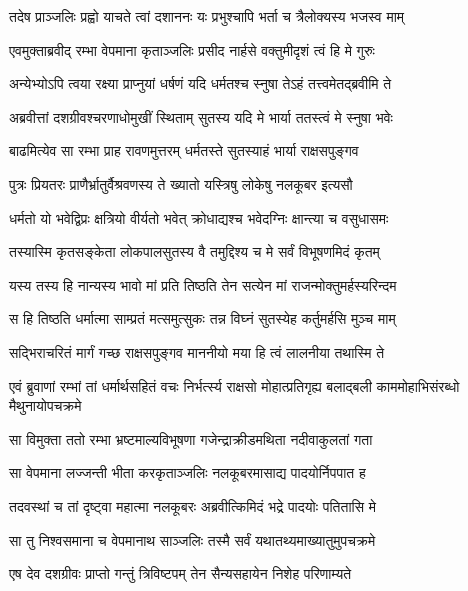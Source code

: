 \twolineshloka
{तदेष प्राञ्जलिः प्रह्वो याचते त्वां दशाननः}
{यः प्रभुश्चापि भर्ता च त्रैलोक्यस्य भजस्व माम्} %

\twolineshloka
{एवमुक्ताब्रवीद् रम्भा वेपमाना कृताञ्जलिः}
{प्रसीद नार्हसे वक्तुमीदृशं त्वं हि मे गुरुः} %

\twolineshloka
{अन्येभ्योऽपि त्वया रक्ष्या प्राप्नुयां धर्षणं यदि}
{धर्मतश्च स्नुषा तेऽहं तत्त्वमेतद्ब्रवीमि ते} %

\twolineshloka
{अब्रवीत्तां दशग्रीवश्चरणाधोमुखीं स्थिताम्}
{सुतस्य यदि मे भार्या ततस्त्वं मे स्नुषा भवेः} %

\twolineshloka
{बाढमित्येव सा रम्भा प्राह रावणमुत्तरम्}
{धर्मतस्ते सुतस्याहं भार्या राक्षसपुङ्गव} %

\twolineshloka
{पुत्रः प्रियतरः प्राणैर्भ्रातुर्वैश्रवणस्य ते}
{ख्यातो यस्त्रिषु लोकेषु नलकूबर इत्यसौ} %

\twolineshloka
{धर्मतो यो भवेद्विप्रः क्षत्रियो वीर्यतो भवेत्}
{क्रोधाद्यश्च भवेदग्निः क्षान्त्या च वसुधासमः} %

\twolineshloka
{तस्यास्मि कृतसङ्केता लोकपालसुतस्य वै}
{तमुद्दिश्य च मे सर्वं विभूषणमिदं कृतम्} %

\twolineshloka
{यस्य तस्य हि नान्यस्य भावो मां प्रति तिष्ठति}
{तेन सत्येन मां राजन्मोक्तुमर्हस्यरिन्दम} %

\twolineshloka
{स हि तिष्ठति धर्मात्मा साम्प्रतं मत्समुत्सुकः}
{तन्न विघ्नं सुतस्येह कर्तुमर्हसि मुञ्च माम्} %

\twolineshloka
{सद्भिराचरितं मार्गं गच्छ राक्षसपुङ्गव}
{माननीयो मया हि त्वं लालनीया तथास्मि ते} %

\threelineshloka
{एवं ब्रुवाणां रम्भां तां धर्मार्थसहितं वचः}
{निर्भर्त्स्य राक्षसो मोहात्प्रतिगृह्य बलाद्बली}
{काममोहाभिसंरब्धो मैथुनायोपचक्रमे} %

\twolineshloka
{सा विमुक्ता ततो रम्भा भ्रष्टमाल्यविभूषणा}
{गजेन्द्राक्रीडमथिता नदीवाकुलतां गता} %

\twolineshloka
{सा वेपमाना लज्जन्ती भीता करकृताञ्जलिः}
{नलकूबरमासाद्य पादयोर्निपपात ह} %

\twolineshloka
{तदवस्थां च तां दृष्ट्वा महात्मा नलकूबरः}
{अब्रवीत्किमिदं भद्रे पादयोः पतितासि मे} %

\twolineshloka
{सा तु निश्वसमाना च वेपमानाथ साञ्जलिः}
{तस्मै सर्वं यथातथ्यमाख्यातुमुपचक्रमे} %

\twolineshloka
{एष देव दशग्रीवः प्राप्तो गन्तुं त्रिविष्टपम्}
{तेन सैन्यसहायेन निशेह परिणाम्यते} %

